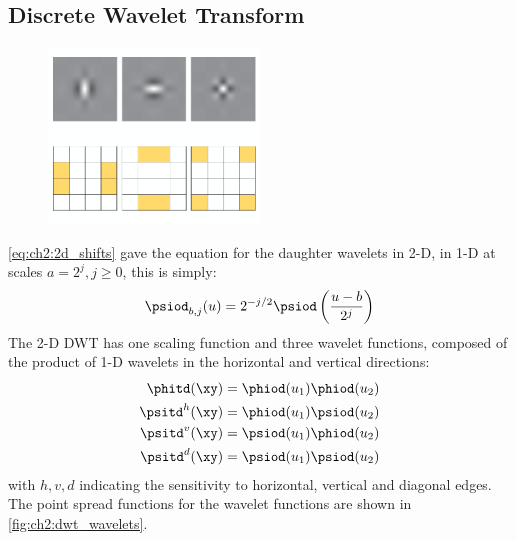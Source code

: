 \subsection{Discrete Wavelet Transform}\label{sec:ch2:dwt_problems}
  \begin{figure}
    \centering
    \includegraphics[width=0.5\textwidth]{litreview/images/dwt_wavelets.png}
      \label{fig:ch2:dwt_wavelets}
  \end{figure}

  \eqref{eq:ch2:2d_shifts} gave the equation for the daughter wavelets in 2-D,
  in 1-D at scales $a=2^j, j \geq 0$, this is simply:
  \begin{equation}
    \psiod_{b, j}(u) = 2^{-j/2} \psiod\left(\frac{u-b}{2^j} \right)
  \end{equation}
  The 2-D DWT has one scaling function and three wavelet functions, composed of
  the product of 1-D wavelets in the horizontal and vertical directions:
  \begin{align}
    \phitd(\xy) &= \phiod(u_1)\phiod(u_2) \label{eq:ch2:dwt1}\\
    \psitd^h(\xy) &= \phiod(u_1) \psiod(u_2) \\
    \psitd^v(\xy) & = \psiod(u_1) \phiod(u_2) \\
    \psitd^d(\xy) & = \psiod(u_1) \psiod(u_2) \label{eq:ch2:dwt4}
  \end{align}
  with $h, v, d$ indicating the sensitivity to horizontal, vertical and diagonal
  edges. The point spread functions for the wavelet functions are shown in
  \autoref{fig:ch2:dwt_wavelets}.
  
